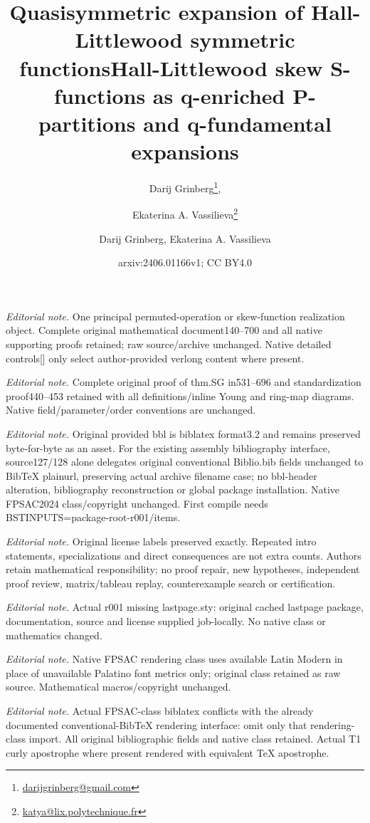 \documentclass[revision]{FPSAC2024}
\title{Quasisymmetric expansion of Hall-Littlewood symmetric functions}
\author[D. Grinberg \and E.A. Vassilieva]{Darij Grinberg\thanks{\href{mailto:darijgrinberg@gmail.com}{darijgrinberg@gmail.com}}\addressmark{1}, \and Ekaterina A. Vassilieva\thanks{\href{mailto:katya@lix.polytechnique.fr}{katya@lix.polytechnique.fr}}\addressmark{2}}
\title{Hall-Littlewood skew S-functions as q-enriched P-partitions and q-fundamental expansions}
\author{Darij Grinberg, Ekaterina A. Vassilieva}
\date{arxiv:2406.01166v1; CC BY4.0}
\begin{document}
\maketitle
\noindent\textit{Editorial note.} One principal permuted-operation or skew-function realization object. Complete original mathematical document140--700 and all native supporting proofs retained; raw source/archive unchanged. Native detailed controls[] only select author-provided verlong content where present.\par\medskip
\noindent\textit{Editorial note.} Complete original proof of thm.SG in531--696 and standardization proof440--453 retained with all definitions/inline Young and ring-map diagrams. Native field/parameter/order conventions are unchanged.\par\medskip
\noindent\textit{Editorial note.} Original provided bbl is biblatex format3.2 and remains preserved byte-for-byte as an asset. For the existing assembly bibliography interface, source127/128 alone delegates original conventional Biblio.bib fields unchanged to BibTeX plainurl, preserving actual archive filename case; no bbl-header alteration, bibliography reconstruction or global package installation. Native FPSAC2024 class/copyright unchanged. First compile needs BSTINPUTS=package-root-r001/items.\par\medskip
\noindent\textit{Editorial note.} Original license labels preserved exactly. Repeated intro statements, specializations and direct consequences are not extra counts. Authors retain mathematical responsibility; no proof repair, new hypotheses, independent proof review, matrix/tableau replay, counterexample search or certification.\par\medskip
\noindent\textit{Editorial note.} Actual r001 missing lastpage.sty: original cached lastpage package, documentation, source and license supplied job-locally. No native class or mathematics changed.\par\medskip
\noindent\textit{Editorial note.} Native FPSAC rendering class uses available Latin Modern in place of unavailable Palatino font metrics only; original class retained as raw source. Mathematical macros/copyright unchanged.\par\medskip
\noindent\textit{Editorial note.} Actual FPSAC-class biblatex conflicts with the already documented conventional-BibTeX rendering interface: omit only that rendering-class import. All original bibliographic fields and native class retained. Actual T1 curly apostrophe where present rendered with equivalent TeX apostrophe.\par\medskip
\end{document}
